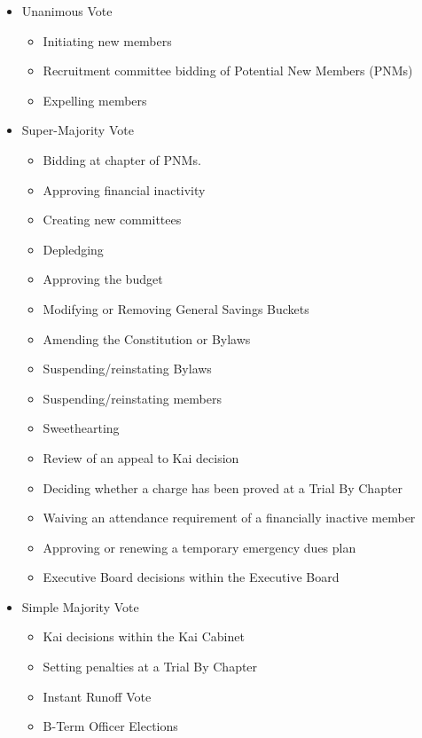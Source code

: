\begin{itemize}
    \item[] Unanimous Vote
        \begin{itemize}
            \item Initiating new members
            \item Recruitment committee bidding of Potential New Members (PNMs)
            \item Expelling members
        \end{itemize}
    \item[] Super-Majority Vote
        \begin{itemize}
            \item Bidding at chapter of PNMs.
            \item Approving financial inactivity
            \item Creating new committees
            \item Depledging
            \item Approving the budget
            \item Modifying or Removing General Savings Buckets
            \item Amending the Constitution or Bylaws
            \item Suspending/reinstating Bylaws
            \item Suspending/reinstating members
            \item Sweethearting
            \item Review of an appeal to Kai decision
            \item Deciding whether a charge has been proved at a Trial By
                Chapter
            \item Waiving an attendance requirement of a financially inactive
                member
            \item Approving or renewing a temporary emergency dues plan
            \item Executive Board decisions within the Executive Board
        \end{itemize}
    \item[] Simple Majority Vote
        \begin{itemize}
            \item Kai decisions within the Kai Cabinet
            \item Setting penalties at a Trial By Chapter
            \item Instant Runoff Vote
            \item B-Term Officer Elections

\end{itemize}
\end{itemize}
